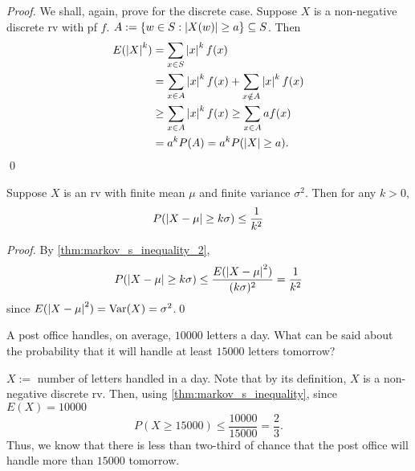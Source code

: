 \documentclass[notoc,notitlepage]{tufte-book}
\DeclareMathOperator{\Var}{Var }
\begin{document}
\begin{proof}
  We shall, again, prove for the discrete case. Suppose $X$ is a non-negative discrete rv with pf $f$. $A := \{w \in S : \left|X(w)\right| \geq a\} \subseteq S$. Then
  \begin{align*}
    E(\left|X\right|^k) &= \sum_{x \in S} \left|x\right|^k f(x) \\
                 &= \sum_{x \in A} \left|x\right|^k f(x) + \sum_{x \notin A} \left|x\right|^k f(x) \\
                 &\geq \sum_{x \in A} \left|x\right|^k f(x) \geq \sum_{x \in A} af(x) \\
                 &= a^k P(A) = a^k P(\left|X\right| \geq a).
  \end{align*}\qed
\end{proof}

\begin{thm}
\label{thm:chebyshev_s_inequality}
  Suppose $X$ is an rv with finite mean $\mu$ and finite variance $\sigma^2$. Then for any $k > 0$,
  \begin{equation}\label{eq:chebyshev_s_inequality}
    P(\left|X - \mu\right| \geq k \sigma) \leq \frac{1}{k^2}
  \end{equation}
\end{thm}

\begin{proof}
  By \cref{thm:markov_s_inequality_2},
  \begin{equation*}
    P(\left|X - \mu\right| \geq k \sigma) \leq \frac{E(\left|X - \mu\right|^2)}{(k\sigma)^2} = \frac{1}{k^2}
  \end{equation*} since $E(\abs{X - \mu}^2) = \Var(X) = \sigma^2$.\qed
\end{proof}

\begin{eg}[Example 2.23]
  A post office handles, on average, $10000$ letters a day. What can be said about the probability that it will handle at least $15000$ letters tomorrow?

  \begin{solution}
    $X :=$ number of letters handled in a day. Note that by its definition, $X$ is a non-negative discrete rv. Then, using \cref{thm:markov_s_inequality}, since $E(X) = 10000$
    \begin{equation*}
      P(X \geq 15000) \leq \frac{10000}{15000} = \frac{2}{3}.
    \end{equation*}
    Thus, we know that there is less than two-third of chance that the post office will handle more than $15000$ tomorrow.
  \end{solution}
\end{eg}
\end{document}

